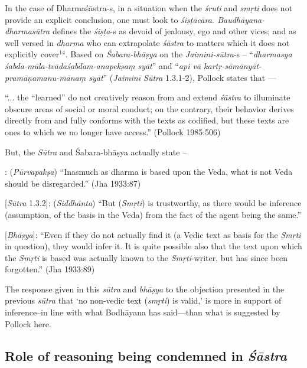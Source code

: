 In the case of Dharmaśāstra-s, in a situation when the {\sl śruti} and {\sl smṛti} does not provide an explicit conclusion, one must look to {\sl śiṣṭācāra. Baudhāyana-dharmasūtra} deﬁnes the {\sl śiṣṭa}-s as devoid of jealousy, ego and other vices; and as well versed in {\sl dharma} who can extrapolate {\sl śāstra} to matters which it does not explicitly cover$^{14}$. Based on {\sl Śabara-bhāṣya} on the {\sl Jaimini-sūtra}-s -- ``{\sl dharmasya śabda-mūla-tvādaśabdam-anapekṣaṃ syāt}''  and ``{\sl api vā kartṛ-sāmānyāt-pramāṇamanu-mānaṃ syāt}'' ({\sl Jaiminī Sūtra} 1.3.1-2), Pollock states that ---
\begin{myquote}
``... the ``learned'' do not creatively reason from and extend {\sl śāstra} to illuminate obscure areas of social or moral conduct; on the contrary, their behavior derives directly from and fully conforms with the texts as codiﬁed, but these texts are ones to which we no longer have access.'' (Pollock 1985:506)
\end{myquote}

But, the {\sl Sūtra} and Śabara-bhāṣya actually state --
\begin{myquote}
[{\sl Sūtra} 1.3.1]: ({\sl Pūrvapakṣa}) ``Inasmuch as dharma is based upon the Veda, what is not Veda should be disregarded.'' (Jha 1933:87)

[{\sl Sūtra} 1.3.2]: ({\sl Siddhānta}) ``But ({\sl Smṛti}) is trustworthy, as there would be inference (assumption, of the basis in the Veda) from the fact of the agent being the same.'' 

[{\sl Bhāṣya}]: ``Even if they do not actually find it (a Vedic text as basis for the {\sl Smṛti} in question), they would infer it. It is quite possible also that the text upon which the {\sl Smṛti} is based was actually known to the {\sl Smṛti}-writer, but has since been forgotten.'' (Jha 1933:89)
\end{myquote}

The response given in this {\sl sūtra} and {\sl bhāṣya} to the objection presented in the previous {\sl sūtra} that `no non-vedic text ({\sl smṛti}) is valid,' is more in support of inference--in line with what Bodhāyana has said---than what is suggested by Pollock here. 

\subsection{Role of reasoning being condemned in {{\sl\bfseries Śāstra}\relax}}\label{art12-sec3.7}

